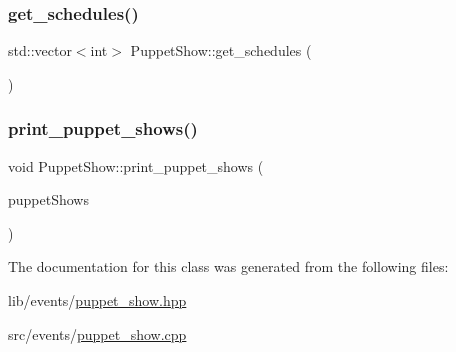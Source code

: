 \subsubsection{\texorpdfstring{get\+\_\+schedules()}{get\_schedules()}}
{\footnotesize\ttfamily std\+::vector$<$int$>$ Puppet\+Show\+::get\+\_\+schedules (\begin{DoxyParamCaption}{ }\end{DoxyParamCaption})\hspace{0.3cm}{\ttfamily [inline]}}

\mbox{\label{class_puppet_show_aea8a4892d7e08b311a49504e22c84c4e}} 
\subsubsection{\texorpdfstring{print\+\_\+puppet\+\_\+shows()}{print\_puppet\_shows()}}
{\footnotesize\ttfamily void Puppet\+Show\+::print\+\_\+puppet\+\_\+shows (\begin{DoxyParamCaption}\item[{std\+::map$<$ int, \hyperlink{class_puppet_show}{Puppet\+Show} $\ast$$>$}]{puppet\+Shows }\end{DoxyParamCaption})\hspace{0.3cm}{\ttfamily [static]}}



The documentation for this class was generated from the following files\+:\begin{DoxyCompactItemize}
\item 
lib/events/\hyperlink{puppet__show_8hpp}{puppet\+\_\+show.\+hpp}\item 
src/events/\hyperlink{puppet__show_8cpp}{puppet\+\_\+show.\+cpp}\end{DoxyCompactItemize}

